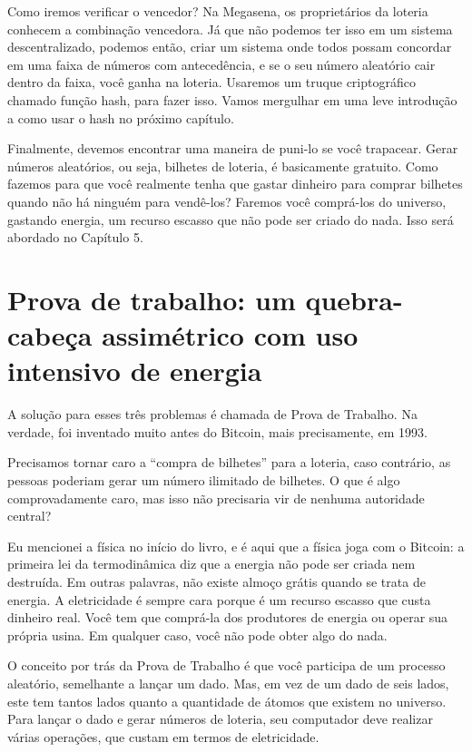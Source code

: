 Como iremos verificar o vencedor? Na Megasena, os proprietários da loteria conhecem a combinação vencedora. Já que não podemos ter isso em um sistema descentralizado, podemos então, criar um sistema onde todos possam concordar em uma faixa de números com antecedência, e se o seu número aleatório cair dentro da faixa, você ganha na loteria. Usaremos um truque criptográfico chamado função hash, para fazer isso. Vamos mergulhar em uma leve introdução a como usar o hash no próximo capítulo.

Finalmente, devemos encontrar uma maneira de puni-lo se você trapacear. Gerar números aleatórios, ou seja, bilhetes de loteria, é basicamente gratuito. Como fazemos para que você realmente tenha que gastar dinheiro para comprar bilhetes quando não há ninguém para vendê-los? Faremos você comprá-los do universo, gastando energia, um recurso escasso que não pode ser criado do nada. Isso será abordado no Capítulo 5.

\section*{Prova de trabalho: um quebra-cabeça assimétrico com uso intensivo de energia}
A solução para esses três problemas é chamada de Prova de Trabalho. Na verdade, foi inventado muito antes do Bitcoin, mais precisamente, em 1993.

Precisamos tornar caro a “compra de bilhetes” para a loteria, caso contrário, as pessoas poderiam gerar um número ilimitado de bilhetes. O que é algo comprovadamente caro, mas isso não precisaria vir de nenhuma autoridade central?

Eu mencionei a física no início do livro, e é aqui que a física joga com o Bitcoin: a primeira lei da termodinâmica diz que a energia não pode ser criada nem destruída. Em outras palavras, não existe almoço grátis quando se trata de energia. A eletricidade é sempre cara porque é um recurso escasso que custa dinheiro real. Você tem que comprá-la dos produtores de energia ou operar sua própria usina. Em qualquer caso, você não pode obter algo do nada.

O conceito por trás da Prova de Trabalho é que você participa de um processo aleatório, semelhante a lançar um dado. Mas, em vez de um dado de seis lados, este tem tantos lados quanto a quantidade de átomos que existem no universo. Para lançar o dado e gerar números de loteria, seu computador deve realizar várias operações, que custam em termos de eletricidade.

